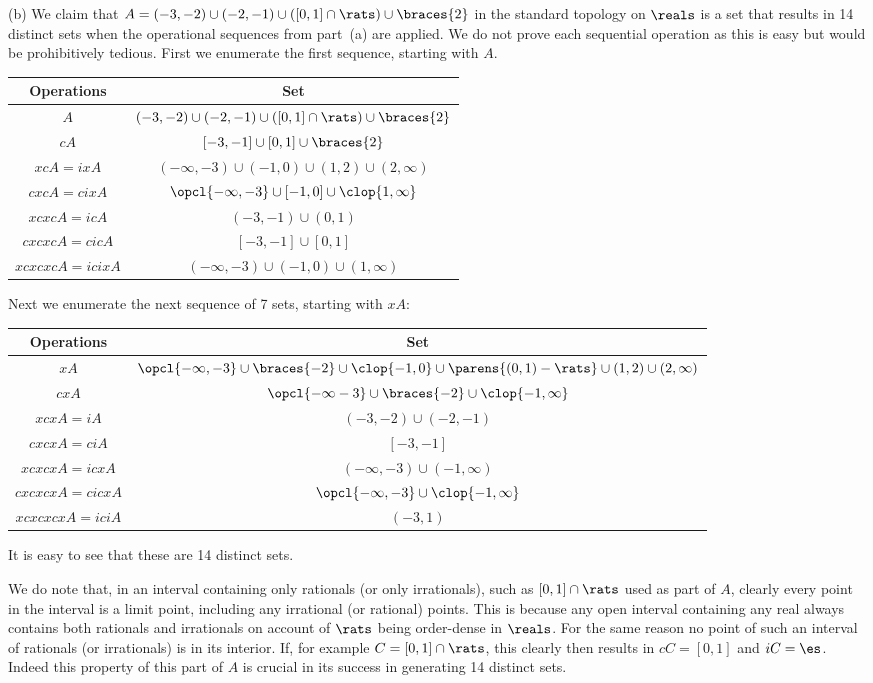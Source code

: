 {  (b) We claim that $A = (-3, -2) \cup (-2, -1)  \cup ([0,1] \cap \rats) \cup \braces{2}$ in the standard topology on $\reals$ is a set that results in 14 distinct sets when the operational sequences from part~(a) are applied.
  We do not prove each sequential operation as this is easy but would be prohibitively tedious.
  First we enumerate the first sequence, starting with $A$.
  \begin{center}
    \begin{tabular}{c|c}
      Operations & Set \\
      \hline
      $A$ & $(-3, -2) \cup (-2, -1) \cup ([0,1] \cap \rats) \cup \braces{2}$ \\
      $cA$ & $[-3,-1] \cup [0,1] \cup \braces{2}$ \\
      $xcA = ixA$ & $(-\infty, -3) \cup (-1, 0) \cup (1,2) \cup (2, \infty)$ \\
      $cxcA = cixA$ & $\opcl{-\infty, -3} \cup [-1,0] \cup \clop{1, \infty}$ \\
      $xcxcA = icA$ & $(-3, -1) \cup (0, 1)$ \\
      $cxcxcA = cicA$ & $[-3, -1] \cup [0, 1]$ \\
      $xcxcxcA = icixA$ & $(-\infty, -3) \cup (-1,0) \cup (1, \infty)$
    \end{tabular}
  \end{center}
  Next we enumerate the next sequence of 7 sets, starting with $xA$:
  \begin{center}
    \begin{tabular}{c|c}
      Operations & Set \\
      \hline
      $xA$ & $\opcl{-\infty,-3} \cup \braces{-2} \cup \clop{-1,0} \cup \parens{(0,1) - \rats} \cup (1,2) \cup (2, \infty)$ \\
      $cxA$ & $\opcl{-\infty -3} \cup \braces{-2} \cup \clop{-1, \infty}$ \\
      $xcxA = iA$ & $(-3, -2) \cup (-2, -1)$ \\
      $cxcxA = ciA$ & $[-3, -1]$ \\
      $xcxcxA = icxA$ & $(-\infty, -3) \cup (-1, \infty)$ \\
      $cxcxcxA = cicxA$ & $\opcl{-\infty, -3} \cup \clop{-1, \infty}$ \\
      $xcxcxcxA = iciA$ & $(-3, 1)$
    \end{tabular}
  \end{center}
  It is easy to see that these are 14 distinct sets.

  We do note that, in an interval containing only rationals (or only irrationals), such as $[0,1] \cap \rats$ used as part of $A$, clearly every point in the interval is a limit point, including any irrational (or rational) points.
  This is because any open interval containing any real always contains both rationals and irrationals on account of $\rats$ being order-dense in $\reals$.
  For the same reason no point of such an interval of rationals (or irrationals) is in its interior.
  If, for example $C = [0,1] \cap \rats$, this clearly then results in $cC = [0,1]$ and $iC = \es$.
  Indeed this property of this part of $A$ is crucial in its success in generating 14 distinct sets.
}
